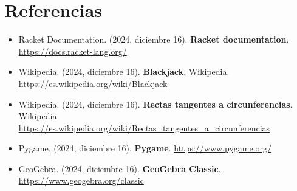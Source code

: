 \section{Referencias}

\begin{frame}
    \begin{itemize}
        \item Racket Documentation. (2024, diciembre 16). \textbf{Racket documentation}. \href{https://docs.racket-lang.org/}{https://docs.racket-lang.org/}
        \item Wikipedia. (2024, diciembre 16). \textbf{Blackjack}. Wikipedia. \href{https://es.wikipedia.org/wiki/Blackjack}{https://es.wikipedia.org/wiki/Blackjack}
        \item Wikipedia. (2024, diciembre 16). \textbf{Rectas tangentes a circunferencias}. Wikipedia. \href{https://es.wikipedia.org/wiki/Rectas_tangentes_a_circunferencias}{https://es.wikipedia.org/wiki/Rectas\_tangentes\_a\_circunferencias}
        \item Pygame. (2024, diciembre 16). \textbf{Pygame}. \href{https://www.pygame.org/}{https://www.pygame.org/}
        \item GeoGebra. (2024, diciembre 16). \textbf{GeoGebra Classic}. \href{https://www.geogebra.org/classic}{https://www.geogebra.org/classic}
    \end{itemize}
\end{frame}